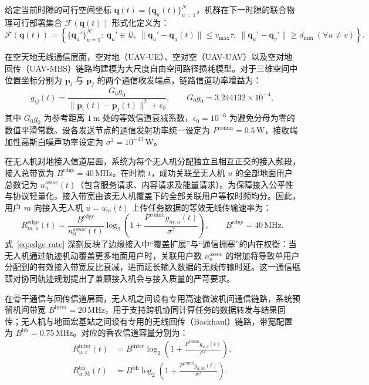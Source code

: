 给定当前时隙的可行空间坐标 $\mathbf q(t) = \{\mathbf q_u(t)\}_{u=1}^N$，机群在下一时隙的联合物理可行部署集合 $\mathcal F(\mathbf q(t))$ 形式化定义为：
\begin{equation}
    \mathcal F(\mathbf q(t))=
    \left\{\{\mathbf q_u'\}_{u=1}^{N}:\ 
    \mathbf q_u'\in\mathcal Q,\ 
    \|\mathbf q_u'-\mathbf q_u(t)\|\leq v_{\max}\tau,\ 
    \|\mathbf q_u'-\mathbf q_v'\|\geq d_{\min}\ (\forall u\ne v)\right\}.
    \label{eq:ch3-motion-feasible}
\end{equation}

在空天地无线通信层面，空对地（UAV-UE）、空对空（UAV-UAV）以及空对地回传（UAV-MBS）链路均建模为大尺度自由空间路径损耗模型。对于三维空间中位置坐标分别为 $\mathbf p_i$ 与 $\mathbf p_j$ 的两个通信收发端点，链路信道功率增益为：
\begin{equation}
    g_{ij}(t) = \frac{G_0 g_0}{\|\mathbf p_i(t) - \mathbf p_j(t)\|^2 + \epsilon_0},
    \qquad G_0 g_0 = 3.244132\times 10^{-4},
    \label{eq:channel-gain}
\end{equation}
其中 $G_0 g_0$ 为参考距离 $1\,\mathrm{m}$ 处的等效信道衰减系数，$\epsilon_0=10^{-6}$ 为避免分母为零的数值平滑常数。设各发送节点的通信发射功率统一设定为 $P^{\mathrm{comm}} = 0.5\,\mathrm{W}$，接收端加性高斯白噪声功率设定为 $\sigma^2 = 10^{-13}\,\mathrm{W}$。

在无人机对地接入信道层面，系统为每个无人机分配独立且相互正交的接入频段，接入总带宽为 $B^{\mathrm{edge}} = 40\,\mathrm{MHz}$。在时隙 $t$，成功关联至无人机 $u$ 的全部地面用户总数记为 $n_u^{\mathrm{assoc}}(t)$（包含服务请求、内容请求及能量请求）。为保障接入公平性与协议轻量化，接入带宽由该无人机覆盖下的全部关联用户等权时频均分。因此，用户 $m$ 向接入无人机 $u=u_m(t)$ 上传任务数据的等效无线传输速率为：
\begin{equation}
    R^{\mathrm{edge}}_{m,u}(t) = 
    \frac{B^{\mathrm{edge}}}{n_u^{\mathrm{assoc}}(t)}
    \log_2\left(1 + \frac{P^{\mathrm{comm}}g_{m,u}(t)}{\sigma^2}\right),
    \qquad B^{\mathrm{edge}}=40\,\mathrm{MHz}.
    \label{eq:edge-rate}
\end{equation}
式~\eqref{eq:edge-rate} 深刻反映了边缘接入中“覆盖扩展”与“通信拥塞”的内在权衡：当无人机通过轨迹机动覆盖更多地面用户时，关联用户数 $n_u^{\mathrm{assoc}}$ 的增加将导致单用户分配到的有效接入带宽反比衰减，进而延长输入数据的无线传输时延。这一通信瓶颈对协同轨迹规划提出了兼顾接入机会与接入质量的严苛要求。

在骨干通信与回传信道层面，无人机之间设有专用高速微波机间通信链路，系统预留机间带宽 $B^{\mathrm{inter}} = 20\,\mathrm{MHz}$，用于支持跨机协同计算任务的数据转发与结果回传；无人机与地面宏基站之间设有专用的无线回传（Backhaul）链路，带宽配置为 $B^{\mathrm{bh}} = 0.75\,\mathrm{MHz}$。对应的香农信道容量分别为：
\begin{equation}
    \begin{aligned}
    R^{\mathrm{inter}}_{u,v}(t) &= B^{\mathrm{inter}} \log_2\left(1 + \frac{P^{\mathrm{comm}}g_{u,v}(t)}{\sigma^2}\right),\\
    R^{\mathrm{bh}}_{u,\mathrm M}(t) &= B^{\mathrm{bh}} \log_2\left(1 + \frac{P^{\mathrm{comm}}g_{u,\mathrm M}(t)}{\sigma^2}\right).
    \end{aligned}
    \label{eq:ch3-other-rates}
\end{equation}

